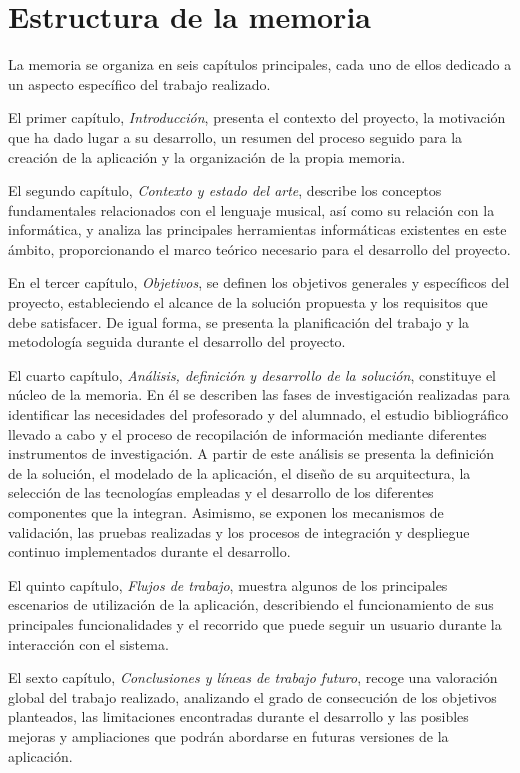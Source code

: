 \section{Estructura de la memoria}

La memoria se organiza en seis capítulos principales, cada uno de ellos dedicado a un aspecto específico del trabajo realizado.

El primer capítulo, \textit{Introducción}, presenta el contexto del proyecto, la motivación que ha dado lugar a su desarrollo, un resumen del proceso seguido para la creación de la aplicación y la organización de la propia memoria.

El segundo capítulo, \textit{Contexto y estado del arte}, describe los conceptos fundamentales relacionados con el lenguaje musical, así como su relación con la informática, y analiza las principales herramientas informáticas existentes en este ámbito, proporcionando el marco teórico necesario para el desarrollo del proyecto.

En el tercer capítulo, \textit{Objetivos}, se definen los objetivos generales y específicos del proyecto, estableciendo el alcance de la solución propuesta y los requisitos que debe satisfacer. De igual forma, se presenta la planificación del trabajo y la metodología seguida durante el desarrollo del proyecto.

El cuarto capítulo, \textit{Análisis, definición y desarrollo de la solución}, constituye el núcleo de la memoria. En él se describen las fases de investigación realizadas para identificar las necesidades del profesorado y del alumnado, el estudio bibliográfico llevado a cabo y el proceso de recopilación de información mediante diferentes instrumentos de investigación. A partir de este análisis se presenta la definición de la solución, el modelado de la aplicación, el diseño de su arquitectura, la selección de las tecnologías empleadas y el desarrollo de los diferentes componentes que la integran. Asimismo, se exponen los mecanismos de validación, las pruebas realizadas y los procesos de integración y despliegue continuo implementados durante el desarrollo.

El quinto capítulo, \textit{Flujos de trabajo}, muestra algunos de los principales escenarios de utilización de la aplicación, describiendo el funcionamiento de sus principales funcionalidades y el recorrido que puede seguir un usuario durante la interacción con el sistema.

El sexto capítulo, \textit{Conclusiones y líneas de trabajo futuro}, recoge una valoración global del trabajo realizado, analizando el grado de consecución de los objetivos planteados, las limitaciones encontradas durante el desarrollo y las posibles mejoras y ampliaciones que podrán abordarse en futuras versiones de la aplicación.

